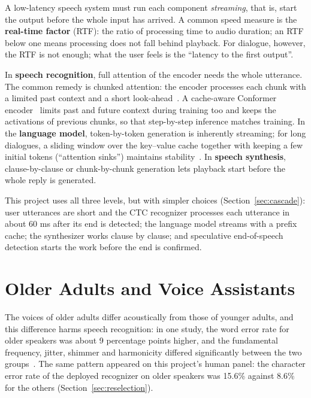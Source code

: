 A low-latency speech system must run each component \emph{streaming}, that is, start
the output before the whole input has arrived. A common speed measure is the
\textbf{real-time factor} (RTF): the ratio of processing time to audio duration; an
RTF below one means processing does not fall behind playback. For dialogue, however,
the RTF is not enough; what the user feels is the ``latency to the first output''.

In \textbf{speech recognition}, full attention of the encoder needs the whole
utterance. The common remedy is chunked attention: the encoder processes each chunk
with a limited past context and a short look-ahead~\cite{chen2021streamingtt}. A
cache-aware Conformer encoder~\cite{noroozi2023cacheaware} limits past and future
context during training too and keeps the activations of previous chunks, so that
step-by-step inference matches training. In the \textbf{language model}, token-by-token
generation is inherently streaming; for long dialogues, a sliding window over the
key--value cache together with keeping a few initial tokens (``attention sinks'')
maintains stability~\cite{xiao2024streamingllm}. In \textbf{speech synthesis},
clause-by-clause or chunk-by-chunk generation lets playback start before the whole
reply is generated.

This project uses all three levels, but with simpler choices
(Section~\ref{sec:cascade}): user utterances are short and the CTC recognizer
processes each utterance in about 60 ms after its end is detected; the language model
streams with a prefix cache; the synthesizer works clause by clause; and speculative
end-of-speech detection starts the work before the end is confirmed.

\section{Older Adults and Voice Assistants}
\label{sec:elderly-lit}

The voices of older adults differ acoustically from those of younger adults, and this
difference harms speech recognition: in one study, the word error rate for older
speakers was about 9 percentage points higher, and the fundamental frequency, jitter,
shimmer and harmonicity differed significantly between the two
groups~\cite{vipperla2010ageing}. The same pattern appeared on this project's human
panel: the character error rate of the deployed recognizer on older speakers was
15.6\% against 8.6\% for the others (Section~\ref{sec:reselection}).


